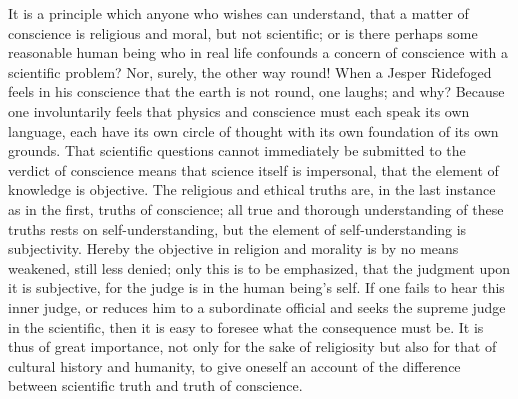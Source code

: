 \documentclass[12pt,a4paper,openany]{book}
\newcommand{\opage}[1]{\marginnote{\footnotesize\textit{[#1]}}}
\begin{document}
\setcounter{footnote}{0}%
\opage{522}It is a principle which anyone who wishes can
understand, that a matter of conscience is religious and moral,
but not scientific; or is there perhaps some reasonable
human being who in real life confounds a
concern of conscience with a scientific problem?
Nor, surely, the other way round! When a Jesper Ridefoged
feels in his conscience that the earth is not round,
one laughs; and why? Because one involuntarily feels
that physics and conscience must each speak its own language, each have
its own circle of thought with its own foundation of its own
grounds. That scientific questions cannot immediately
be submitted to the verdict of conscience
means that science itself is impersonal, that the element of
knowledge is objective. The religious and ethical truths
are, in the last instance as in the first, truths of conscience;
all true and thorough understanding of
these truths rests on self-understanding, but the element of
self-understanding is subjectivity. Hereby the
objective in religion and morality is by no means weakened,
still less denied; only this is to be emphasized, that
the judgment upon it is subjective, for the judge is in the human being's
self. If one fails to hear this inner judge, or
reduces him to a subordinate official and seeks
the supreme judge in the scientific, then it is easy to
foresee what the consequence must be. It is thus of great importance,
not only for the sake of religiosity but also for that of cultural history and humanity,
to give oneself an account
of the difference between scientific truth and truth of conscience.
\end{document}
